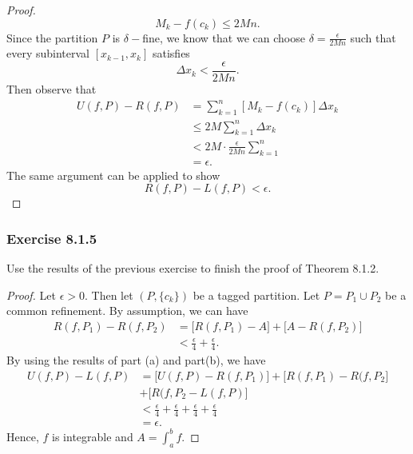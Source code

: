 \begin{enumerate}
\begin{proof}
            \[   M_{k } - f(c_{k }) \leq  2Mn. \] Since the partition \( P  \) is \( \delta- \)fine, we know that we can choose \( \delta = \frac{ \epsilon  }{ 2Mn }  \) such that every subinterval \( [x_{k-1}, x_{k}] \) satisfies 
            \[ \Delta x_{k } < \frac{ \epsilon  }{ 2Mn }. \] Then observe that 
        \begin{align*}
            U(f,P) - R(f,P)   &= \sum_{ k=1 }^{ n } [ M_{k } - f(c_{k })]  \Delta x_{k }\\
                              &\leq 2M \sum_{ k=1 }^{n } \Delta x_{k }  \\ 
                              &< 2M \cdot \frac{ \epsilon  }{ 2Mn } \sum_{ k=1 }^{ n } \\
                              &= \epsilon.
        \end{align*}
        The same argument can be applied to show 
        \[  R(f,P) - L(f,P) < \epsilon. \]
        \end{proof}
\end{enumerate}

\subsubsection{Exercise 8.1.5} Use the results of the previous exercise to finish the proof of Theorem 8.1.2.

\begin{proof}
Let \( \epsilon > 0  \). Then let \( (P, \{ c_{k } \}) \) be a tagged partition. Let \( P = P_{1} \cup P_{2} \) be a common refinement. By assumption, we can have 
\begin{align*}
    R(f,P_{1}) - R(f, P_{2}) &= \big[ R(f, P_{1}) - A  \big] + \big[ A - R(f, P_{2})\big]  \\
                             &< \frac{ \epsilon  }{ 4 }  + \frac{ \epsilon  }{ 4 }.
\end{align*} By using the results of part (a) and part(b), we have 
\begin{align*}
    U(f,P) - L(f,P) &= \big[ U(f,P) - R(f,P_{1}) \big]  + \big[ R(f,P_{1}) - R(f,P_{2} \big] \\ 
                    &+ \big[ R(f,P_{2} - L(f,P) \big]  \\
                    &< \frac{ \epsilon  }{ 4 }  + \frac{ \epsilon  }{ 4 }  + \frac{ \epsilon  }{ 4 }  + \frac{ \epsilon  }{ 4  } \\
                    &= \epsilon.
\end{align*}
Hence, \( f  \) is integrable and \( A = \int_{ a }^{ b } f  \).
\end{proof}

